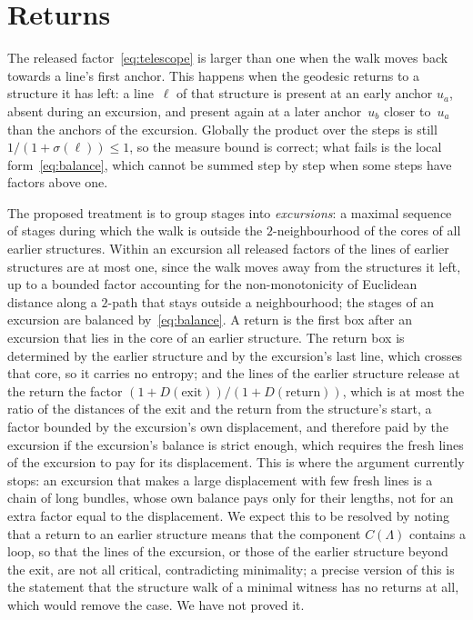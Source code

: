 \documentclass[11pt,letterpaper]{article}
\begin{document}
\section{Returns}
\label{sec:returns}

The released factor~\eqref{eq:telescope} is larger than one when the walk moves back towards a line's first anchor. This happens when the geodesic returns to a structure it has left: a line~$\ell$ of that structure is present at an early anchor $u_a$, absent during an excursion, and present again at a later anchor~$u_b$ closer to~$u_a$ than the anchors of the excursion. Globally the product over the steps is still $1/(1+\sigma(\ell))\le1$, so the measure bound is correct; what fails is the local form~\eqref{eq:balance}, which cannot be summed step by step when some steps have factors above one.

The proposed treatment is to group stages into \emph{excursions}: a maximal sequence of stages during which the walk is outside the $2$-neighbourhood of the cores of all earlier structures. Within an excursion all released factors of the lines of earlier structures are at most one, since the walk moves away from the structures it left, up to a bounded factor accounting for the non-monotonicity of Euclidean distance along a $2$-path that stays outside a neighbourhood; the stages of an excursion are balanced by~\eqref{eq:balance}. A return is the first box after an excursion that lies in the core of an earlier structure. The return box is determined by the earlier structure and by the excursion's last line, which crosses that core, so it carries no entropy; and the lines of the earlier structure release at the return the factor $(1+D(\text{exit}))/(1+D(\text{return}))$, which is at most the ratio of the distances of the exit and the return from the structure's start, a factor bounded by the excursion's own displacement, and therefore paid by the excursion if the excursion's balance is strict enough, which requires the fresh lines of the excursion to pay for its displacement. This is where the argument currently stops: an excursion that makes a large displacement with few fresh lines is a chain of long bundles, whose own balance pays only for their lengths, not for an extra factor equal to the displacement. We expect this to be resolved by noting that a return to an earlier structure means that the component $C(\Lambda)$ contains a loop, so that the lines of the excursion, or those of the earlier structure beyond the exit, are not all critical, contradicting minimality; a precise version of this is the statement that the structure walk of a minimal witness has no returns at all, which would remove the case. We have not proved it.
\end{document}
